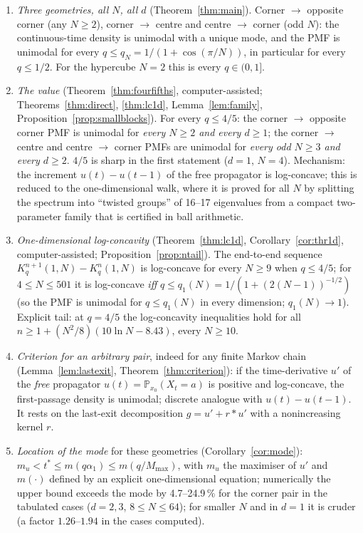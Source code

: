 \documentclass[11pt,a4paper]{article}
\theoremstyle{definition}
\newcommand{\Prob}{\mathbb P}
\begin{document}
\begin{enumerate}
\item \emph{Three geometries, all $N$, all $d$} (Theorem~\ref{thm:main}). Corner $\to$ opposite corner (any $N\ge2$), corner $\to$ centre and centre $\to$ corner (odd $N$): the continuous-time density is unimodal with a unique mode, and the PMF is unimodal for every $q\le q_N=1/(1+\cos(\pi/N))$, in particular for every $q\le1/2$. For the hypercube $N=2$ this is every $q\in(0,1]$.
\item \emph{The value} (Theorem~\ref{thm:fourfifths}, computer-assisted; Theorems~\ref{thm:direct}, \ref{thm:lc1d}, Lemma~\ref{lem:family}, Proposition~\ref{prop:smallblocks}). For every $q\le4/5$: the corner $\to$ opposite corner PMF is unimodal for \emph{every $N\ge2$ and every $d\ge1$}; the corner $\to$ centre and centre $\to$ corner PMFs are unimodal for \emph{every odd $N\ge3$ and every $d\ge2$}. $4/5$ is sharp in the first statement ($d=1$, $N=4$). Mechanism: the increment $u(t)-u(t-1)$ of the free propagator is log-concave; this is reduced to the one-dimensional walk, where it is proved for all $N$ by splitting the spectrum into ``twisted groups'' of 16--17 eigenvalues from a compact two-parameter family that is certified in ball arithmetic.
\item \emph{One-dimensional log-concavity} (Theorem~\ref{thm:lc1d}, Corollary~\ref{cor:thr1d}, computer-assisted; Proposition~\ref{prop:ntail}). The end-to-end sequence $K_q^{n+1}(1,N)-K_q^n(1,N)$ is log-concave for every $N\ge9$ when $q\le4/5$; for $4\le N\le501$ it is log-concave \emph{iff} $q\le q_1(N)=1/(1+(2(N-1))^{-1/2})$ (so the PMF is unimodal for $q\le q_1(N)$ in every dimension; $q_1(N)\to1$). Explicit tail: at $q=4/5$ the log-concavity inequalities hold for all $n\ge1+(N^2/8)(10\ln N-8.43)$, every $N\ge10$.
\item \emph{Criterion for an arbitrary pair}, indeed for any finite Markov chain (Lemma~\ref{lem:lastexit}, Theorem~\ref{thm:criterion}): if the time-derivative $u'$ of the \emph{free} propagator $u(t)=\Prob_{x_0}(X_t=a)$ is positive and log-concave, the first-passage density is unimodal; discrete analogue with $u(t)-u(t-1)$. It rests on the last-exit decomposition $g=u'+r*u'$ with a nonincreasing kernel $r$.
\item \emph{Location of the mode} for these geometries (Corollary~\ref{cor:mode}): $m_u<t^*\le m(q\alpha_1)\le m(q/M_{\max})$, with $m_u$ the maximiser of $u'$ and $m(\cdot)$ defined by an explicit one-dimensional equation; numerically the upper bound exceeds the mode by 4.7--24.9\,\% for the corner pair in the tabulated cases ($d=2,3$, $8\le N\le64$); for smaller $N$ and in $d=1$ it is cruder (a factor $1.26$--$1.94$ in the cases computed).

\end{enumerate}
\end{document}
